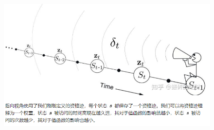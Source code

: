 \documentclass[12pt, a4paper]{paper}
\begin{document}
\begin{figure}[h]
	\begin{center}
		\includegraphics[width=\linewidth]{back-view.png}
	\end{center}
\end{figure}
\end{document}
